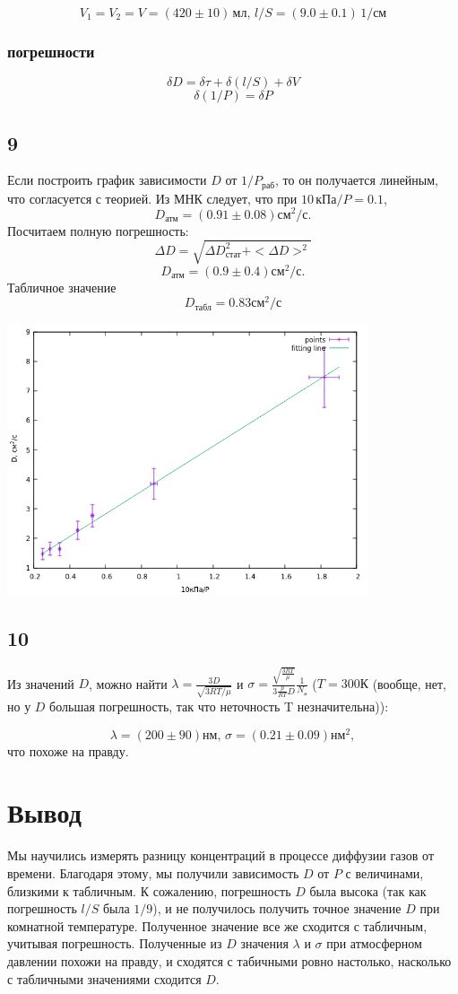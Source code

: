 $$V_1=V_2=V=(420\pm10)\,\text{мл},\,l/S=(9.0\pm0.1)\,1/\text{см}$$

\subsubsection*{погрешности}
$$\delta D = \delta \tau + \delta (l/S) + \delta V$$
$$\delta (1/P) = \delta P$$

\subsection*{9}
Если построить график зависимости $D$ от $1/P_\text{раб}$, то он получается линейным, что согласуется с теорией.
Из МНК следует, что при $10\,\text{кПа}/P = 0.1$,
$$D_\text{атм} = (0.91\pm 0.08) \text{см}^2/\text{с}.$$
Посчитаем полную погрешность:
$$\Delta D = \sqrt{\Delta D_\text{стат}^2 + <\Delta D>^2}$$
$$D_\text{атм} = (0.9 \pm 0.4) \text{см}^2/\text{с}.$$
Табличное значение
$$D_\text{табл} = 0.83 \text{см}^2/\text{с}$$
\begin{center}
	\includegraphics[width=0.80\textwidth]{plot_1.png}
\end{center}
\subsection*{10}
Из значений $D$, можно найти $\lambda = \frac{3D}{\sqrt{3RT/\mu}}$ и $\sigma = \frac{\sqrt{\frac{3RT}{\mu}}}{3\frac{p}{RT}D} \frac{1}{N_\text{а}}$ ($T=300\text{К}$ (вообще, нет, но у $D$ большая погрешность, так что неточность T незначительна)):

$$\lambda = (200\pm90)\text{нм},\,\sigma = (0.21\pm0.09)\text{нм}^2,$$
что похоже на правду.
\section*{Вывод}
Мы научились измерять разницу концентраций в процессе диффузии газов от времени. Благодаря этому, мы получили зависимость $D$ от $P$ с величинами, близкими к табличным. К сожалению, погрешность $D$ была высока (так как погрешность $l/S$ была $1/9$), и не получилось получить точное значение $D$ при комнатной температуре. Полученное значение все же сходится с табличным, учитывая погрешность. Полученные из $D$ значения $\lambda$ и $\sigma$ при атмосферном давлении похожи на правду, и сходятся с табичными ровно настолько, насколько с табличными значениями сходится $D$.





